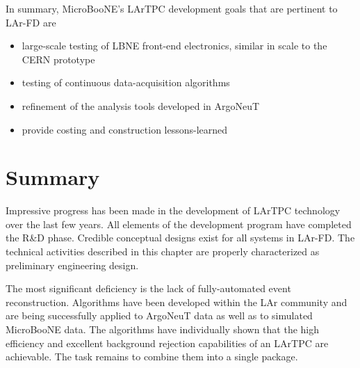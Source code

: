 \noindent  In summary, MicroBooNE's LArTPC development goals that are pertinent to LAr-FD are
\begin{itemize}
\item large-scale testing of LBNE front-end electronics, similar in scale to the CERN prototype
\item testing of continuous data-acquisition algorithms
\item refinement of the analysis tools developed in ArgoNeuT
\item provide costing and construction lessons-learned
\end{itemize}

\section{Summary}

Impressive progress has been made in the development of LArTPC technology over the last few years. All elements of the development program have completed the R\&D phase. Credible conceptual designs exist for all systems in LAr-FD. The technical activities described in this chapter are properly characterized as preliminary engineering design.

The most significant deficiency is the lack of fully-automated event reconstruction. Algorithms have been developed within the LAr community and are being successfully applied to ArgoNeuT data as well as to simulated MicroBooNE data. The algorithms have individually shown that the high efficiency and excellent background rejection capabilities of an LArTPC are achievable. The task remains to combine them into a single package. 


